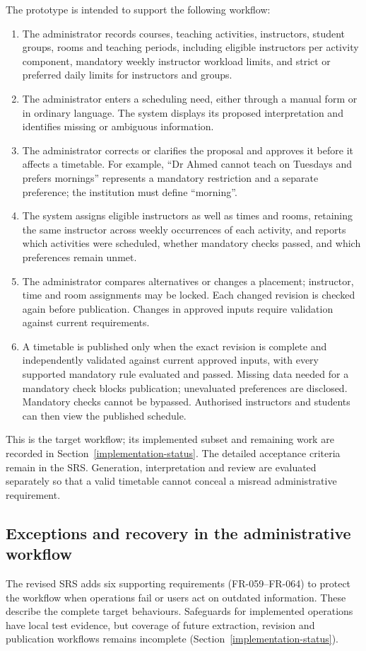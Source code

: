 \documentclass[
  11pt,a4paper,oneside]{report}
\begin{document}
The prototype is intended to support the following workflow:
\begin{enumerate}
\item The administrator records courses, teaching activities, instructors, student groups, rooms and teaching periods, including eligible instructors per activity component, mandatory weekly instructor workload limits, and strict or preferred daily limits for instructors and groups.
\item The administrator enters a scheduling need, either through a manual form or in ordinary language. The system displays its proposed interpretation and identifies missing or ambiguous information.
\item The administrator corrects or clarifies the proposal and approves it before it affects a timetable. For example, ``Dr Ahmed cannot teach on Tuesdays and prefers mornings'' represents a mandatory restriction and a separate preference; the institution must define ``morning''.
\item The system assigns eligible instructors as well as times and rooms, retaining the same instructor across weekly occurrences of each activity, and reports which activities were scheduled, whether mandatory checks passed, and which preferences remain unmet.
\item The administrator compares alternatives or changes a placement; instructor, time and room assignments may be locked. Each changed revision is checked again before publication. Changes in approved inputs require validation against current requirements.
\item A timetable is published only when the exact revision is complete and independently validated against current approved inputs, with every supported mandatory rule evaluated and passed. Missing data needed for a mandatory check blocks publication; unevaluated preferences are disclosed. Mandatory checks cannot be bypassed. Authorised instructors and students can then view the published schedule.
\end{enumerate}
This is the target workflow; its implemented subset and remaining work are recorded in Section~\ref{implementation-status}. The detailed acceptance criteria remain in the SRS. Generation, interpretation and review are evaluated separately so that a valid timetable cannot conceal a misread administrative requirement.

\subsection{Exceptions and recovery in the administrative workflow}
The revised SRS adds six supporting requirements (FR-059--FR-064) to protect the workflow when operations fail or users act on outdated information. These describe the complete target behaviours. Safeguards for implemented operations have local test evidence, but coverage of future extraction, revision and publication workflows remains incomplete (Section~\ref{implementation-status}).
\end{document}
